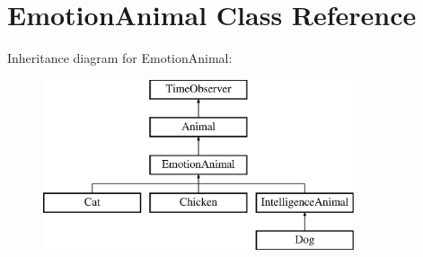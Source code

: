 \hypertarget{class_emotion_animal}{}\section{Emotion\+Animal Class Reference}
\label{class_emotion_animal}
Inheritance diagram for Emotion\+Animal\+:\begin{figure}[H]
\begin{center}
\leavevmode
\includegraphics[height=5.000000cm]{class_emotion_animal}
\end{center}
\end{figure}
